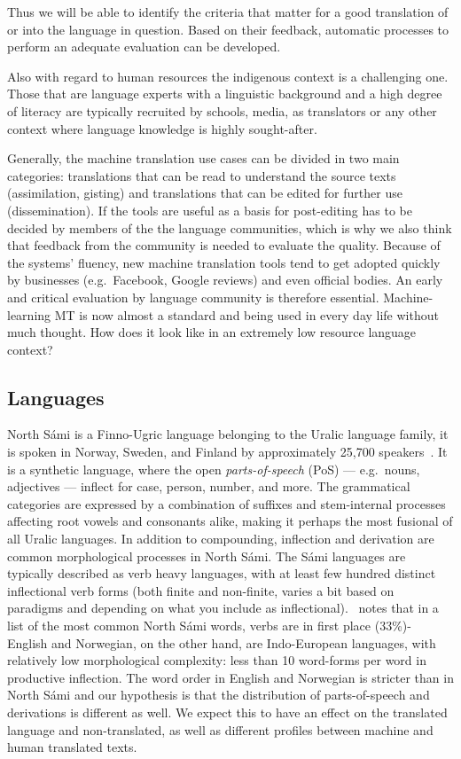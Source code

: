 \documentclass{flammie}
\begin{document}
Thus we will be able to identify the criteria that matter for a good translation
of or into the language in question.  Based on their feedback, automatic
processes to perform an adequate evaluation can be developed.

Also with regard to human resources the indigenous context is a challenging one.
Those that are language experts with a linguistic background and a high degree
of literacy are typically recruited by schools, media, as translators or any
other context where language knowledge is highly sought-after.


Generally, the machine translation use cases can be divided in two main
categories: translations that can be read to understand the source texts
(assimilation, gisting) and translations that can be edited for further use
(dissemination).  If the tools are useful as a basis for post-editing has to be
decided by members of the the language communities, which is why we also think
that feedback from the community is needed to evaluate the quality.  Because of
the systems' fluency, new machine translation tools tend to get adopted quickly
by businesses (e.g.\ Facebook, Google reviews) and even official bodies. An
early and critical evaluation by language community is therefore essential.
Machine-learning MT is now almost a standard and being used in every day life
without much thought.  How does it look like in an extremely low resource
language context?~\cite{Moorkens2018translation}

\subsection{Languages}

North Sámi is a Finno-Ugric language belonging to the Uralic language family, it
is spoken in Norway, Sweden, and Finland by approximately 25,700
speakers~\cite{Ethnologue2022}. It is a synthetic language, where the open
\textit{parts-of-speech} (PoS) --- e.g.\ nouns, adjectives --- inflect for case,
person, number, and more. The grammatical categories are expressed by a
combination of suffixes and stem-internal processes affecting root vowels and
consonants alike, making it perhaps the most fusional of all Uralic languages.
In addition to compounding, inflection and derivation are common morphological
processes in North Sámi.  The Sámi languages are typically described as verb
heavy languages, with at least few hundred distinct inflectional verb forms
(both finite and non-finite, varies a bit based on paradigms and depending on
what you include as inflectional).~\cite{Sammallahti1998saami} notes that in a list
of the most common North Sámi words, verbs are in first place (33\%)- English
and Norwegian, on the other hand, are Indo-European languages, with relatively
low morphological complexity: less than 10 word-forms per word in productive
inflection.  The word order in English and Norwegian is stricter than in North
Sámi and our hypothesis is that the distribution of parts-of-speech and
derivations is different as well.  We expect this to have an effect on the
translated language and non-translated, as well as different profiles between
machine and human translated texts.
\end{document}
